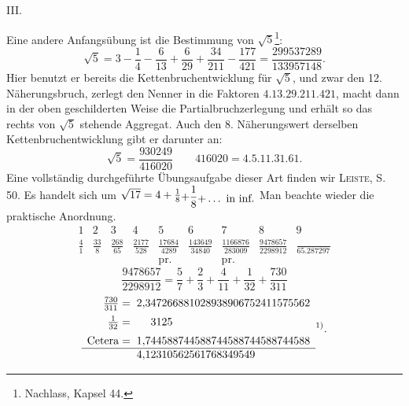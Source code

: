 \clearpage\begingroup
{}
\renewcommand{\thefootnote}{\arabic{footnote})}\setcounter{footnote}{0}
\newcommand{\MDown}[2]{\mathord{\raisebox{#1}{$\displaystyle #2$}}}
\begin{center}III.\\[3pt]{\large{}}\end{center}
\noindent\hspace*{\parindent}Eine andere Anfangsübung ist die Bestimmung von $\sqrt{5}$\footnote{Nachlass, Kapsel 44.}:
\[
\sqrt{5}=3-\frac{1}{4}-\frac{6}{13}+\frac{6}{29}+\frac{34}{211}-\frac{177}{421}=\frac{299537289}{133957148}.
\]
\noindent Hier benutzt er bereits die Kettenbruchentwicklung für $\sqrt{5}$, und zwar den
12. Näherungsbruch, zerlegt den Nenner in die Faktoren $4\mathord{.}13\mathord{.}29\mathord{.}211\mathord{.}421$,
macht dann in der oben geschilderten Weise die Partialbruchzerlegung und
erhält so das rechts von $\sqrt{5}$ stehende Aggregat. Auch den 8. Näherungswert
derselben Kettenbruchentwicklung gibt er darunter an:
\[
\sqrt{5}=\frac{930249}{416020}\qquad 416020=4\mathord{.}5\mathord{.}11\mathord{.}31\mathord{.}61.
\]
\clearpage{}
\setcounter{footnote}{0}
\noindent Eine vollständig durchgeführte Übungsaufgabe dieser Art finden wir \textsc{Leiste},
S. 50. Es handelt sich um $\sqrt{17}=4+\frac{1}{8}\MDown{-.4ex}{+\frac{1}{8}}\MDown{-.8ex}{+\ldots\ \text{in inf.}}$
Man beachte wieder die praktische Anordnung.
\begingroup\small\setlength{\arraycolsep}{3pt}
\[
\begin{array}{ccccccccc}
\scriptstyle1&\scriptstyle2&\scriptstyle3&\scriptstyle4&\scriptstyle5&\scriptstyle6&\scriptstyle7&\scriptstyle8&\scriptstyle9\\
\frac{4}{1}&\frac{33}{8}&\frac{268}{65}&\frac{2177}{528}&\frac{17684}{4289}&\frac{143649}{34840}&\frac{1166876}{283009}&\frac{9478657}{2298912}&\frac{}{65\mathord{.}287297}\\
&&&&\text{pr.}&&\text{pr.}&&
\end{array}
\]
\endgroup
\[
\frac{9478657}{2298912}=\frac{5}{7}+\frac{2}{3}+\frac{4}{11}+\frac{1}{32}+\frac{730}{311}
\]
\begingroup\small
\[
\begin{array}{r@{\;}l}
\frac{730}{311}={}&2{,}347266881028938906752411575562\\[5pt]
\frac{1}{32}={}&\phantom{0{,}0}3125\\[5pt]
\text{Cetera}={}&1{,}744588744588744588744588744588\\\hline
&4{,}12310562561768349549
\end{array}\text{\textsuperscript{1)}}.
\]
